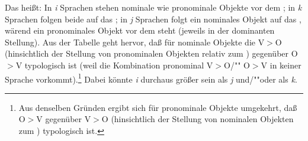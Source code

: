 \documentclass[output=paper]{langsci/langscibook}
\begin{document}
Das heißt: In \textit{i} Sprachen stehen nominale wie pronominale Objekte vor dem ; in \textit{k} Sprachen folgen beide auf das ; in \textit{j} Sprachen folgt ein nominales Objekt auf das , wärend ein pronominales Objekt vor dem  steht (jeweils in der
dominanten Stellung). Aus der Tabelle geht hervor, daß für nominale Objekte die  V$>$O (hinsichtlich der Stellung von pronominalen Objekten relativ zum
) gegenüber O$>$V typologisch  ist (weil die Kombination pronominal
V$>$O/"" O$>$V in keiner Sprache vorkommt).\footnote{%
  Aus denselben Gründen ergibt sich für pronominale Objekte umgekehrt, daß O$>$V gegenüber V$>$O
  (hinsichtlich der Stellung von nominalen Objekten zum ) typologisch  ist.%
}
Dabei könnte \emph{i} durchaus größer
sein als \emph{j} und/""oder als \emph{k}.
\end{document}
